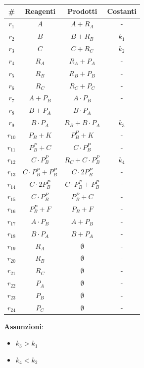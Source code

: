 \documentclass{article}
\begin{document}
\begin{table}[H]
  \centering
  \begin{tabular}{c|c|c|c}
    \# & \textbf{Reagenti} & \textbf{Prodotti} & \textbf{Costanti}\\
    \hline
    \hline
    $r_1$ & $A$ & $A+R_A$ & -\\
    $r_2$ & $B$ & $B+R_B$ & $k_1$\\
    $r_3$ & $C$ & $C+R_C$ & $k_2$\\
    $r_4$ & $R_A$ & $R_A+P_A$ & -\\
    $r_5$ & $R_B$ & $R_B+P_B$ & -\\
    $r_6$ & $R_C$ & $R_C+P_C$ & -\\
    $r_7$ & $A+P_B$ & $A\cdot P_B$ & -\\
    $r_8$ & $B+P_A$ & $B\cdot P_A$ & -\\
    $r_9$ & $B\cdot P_A$ & $R_B+B\cdot P_A$ & $k_3$\\
    $r_{10}$ & $P_B+K$ & $P_B^P+K$ & -\\
    $r_{11}$ & $P_B^P+C$ & $C\cdot P_B^P$ & -\\
    $r_{12}$ & $C\cdot P_B^P$ & $R_C+C\cdot P_B^P$ & $k_4$\\
    $r_{13}$ & $C\cdot P_B^P+P_B^P$ & $C\cdot 2P_B^P$ & -\\
    $r_{14}$ & $C\cdot 2P_B^P$ & $C\cdot P_B^P+P_B^P$ & -\\
    $r_{15}$ & $C\cdot P_B^P$ & $P_B^P+C$ & -\\
    $r_{16}$ & $P_B^P+F$ & $P_B+F$ & -\\
    $r_{17}$ & $A\cdot P_B$ & $A+P_B$ & -\\
    $r_{18}$ & $B\cdot P_A$ & $B+P_A$ & -\\
    $r_{19}$ & $R_A$ & $\emptyset$ & -\\
    $r_{20}$ & $R_B$ & $\emptyset$ & -\\
    $r_{21}$ & $R_C$ & $\emptyset$ & -\\
    $r_{22}$ & $P_A$ & $\emptyset$ & -\\
    $r_{23}$ & $P_B$ & $\emptyset$ & -\\
    $r_{24}$ & $P_C$ & $\emptyset$ & -\\
  \end{tabular}
\end{table}
\textbf{Assunzioni}:
\begin{itemize}
  \item $k_3>k_1$
  \item $k_4<k_2$
\end{itemize}
\end{document}
